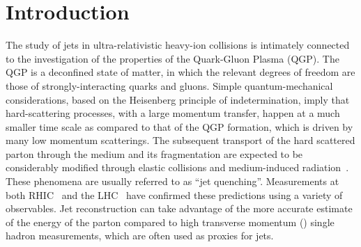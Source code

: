 \documentclass[3p,times]{simplearticle}
\begin{document}

\section{Introduction}
\label{intro}
%
The study of jets in ultra-relativistic heavy-ion collisions is intimately connected 
to the investigation of the properties of the Quark-Gluon Plasma (QGP).
The QGP is a deconfined state of matter, in which the relevant degrees of freedom are those of strongly-interacting quarks and gluons.
Simple quantum-mechanical considerations, based on the Heisenberg principle of indetermination, 
imply that hard-scattering processes, with a large
momentum transfer, happen at a much smaller time scale as compared to that of the QGP formation, which is driven by many low momentum scatterings.
The subsequent transport of the hard scattered parton through the medium and its fragmentation are expected to be considerably modified through 
elastic collisions and medium-induced radiation~\cite{Baier:1995}. These phenomena are usually referred to as ``jet quenching''.
Measurements at both RHIC~\cite{STAR:2003c, PHENIX:2004a} 
and the LHC~\cite{CMS:2011c, ALICE:2014a, ATLAS:2013b}
have confirmed these predictions using a variety of observables.
Jet reconstruction can take advantage of the more accurate estimate of the energy of the parton compared
to high transverse momentum (\pT) single hadron measurements, which are often used as proxies for jets.
\end{document}
